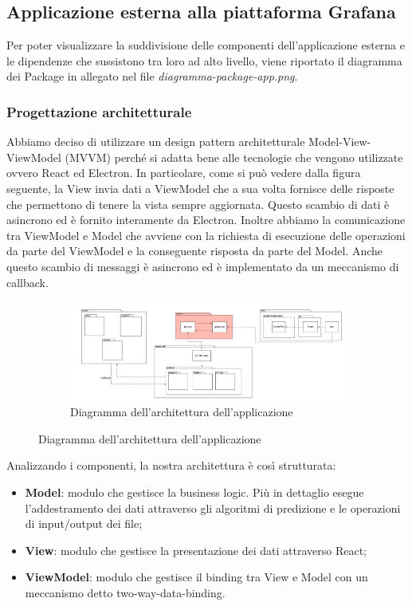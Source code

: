 \subsection{Applicazione esterna alla piattaforma Grafana}
Per poter visualizzare la suddivisione delle componenti dell'applicazione esterna e le dipendenze che sussistono tra loro ad alto livello, viene riportato il diagramma dei Package in allegato nel file \textit{diagramma-package-app.png}.
	\subsubsection{Progettazione architetturale}
	Abbiamo deciso di utilizzare un design pattern architetturale Model-View-ViewModel (MVVM) perché si adatta bene alle tecnologie che vengono utilizzate ovvero React ed Electron. In particolare, come si può vedere dalla figura seguente, la View invia dati a ViewModel che a sua volta fornisce delle risposte che permettono di tenere la vista sempre aggiornata. Questo scambio di dati è asincrono ed è fornito interamente da Electron. Inoltre abbiamo la comunicazione tra ViewModel e Model che avviene con la richiesta di esecuzione delle operazioni da parte del ViewModel e la conseguente risposta da parte del Model. Anche questo scambio di messaggi è asincrono ed è implementato da un meccanismo di callback.
	\mbox{}
	\begin{landscape}
		\begin{figure}
			\begin{figure} [H]
				\includegraphics[width=\linewidth]{./img/Diagrammi/architettura-app.png}
				\caption{Diagramma dell'architettura dell'applicazione}
			\end{figure}
		\end{figure}
	\end{landscape}
	Analizzando i componenti, la nostra architettura è così strutturata: 
	\begin{itemize}
		\item \textbf{Model}: modulo che gestisce la business logic. Più in dettaglio esegue l'addestramento dei dati attraverso gli algoritmi di predizione e le operazioni di input/output dei file;
		\item \textbf{View}: modulo che gestisce la presentazione dei dati attraverso React;
		\item \textbf{ViewModel}: modulo che gestisce il binding tra View e Model con un meccanismo detto two-way-data-binding.
	\end{itemize}
